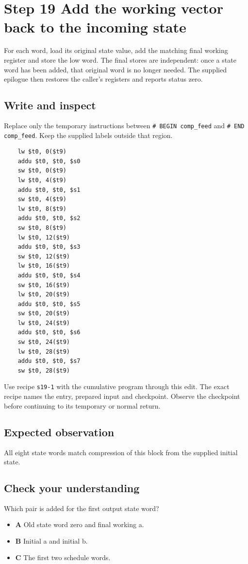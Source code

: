 \section{Step 19 Add the working vector back to the incoming state}\label{sha-s19}

For each word, load its original state value, add the matching final working register and store the low word. The final stores are independent: once a state word has been added, that original word is no longer needed. The supplied epilogue then restores the caller's registers and reports status zero.

\subsection{Write and inspect}
Replace only the temporary instructions between \texttt{\# BEGIN comp\_feed} and \texttt{\# END comp\_feed}. Keep the supplied labels outside that region.

\begin{verbatim}
    lw $t0, 0($t9)
    addu $t0, $t0, $s0
    sw $t0, 0($t9)
    lw $t0, 4($t9)
    addu $t0, $t0, $s1
    sw $t0, 4($t9)
    lw $t0, 8($t9)
    addu $t0, $t0, $s2
    sw $t0, 8($t9)
    lw $t0, 12($t9)
    addu $t0, $t0, $s3
    sw $t0, 12($t9)
    lw $t0, 16($t9)
    addu $t0, $t0, $s4
    sw $t0, 16($t9)
    lw $t0, 20($t9)
    addu $t0, $t0, $s5
    sw $t0, 20($t9)
    lw $t0, 24($t9)
    addu $t0, $t0, $s6
    sw $t0, 24($t9)
    lw $t0, 28($t9)
    addu $t0, $t0, $s7
    sw $t0, 28($t9)
\end{verbatim}

Use recipe \texttt{s19-1} with the cumulative program through this edit. The exact recipe names the entry, prepared input and checkpoint. Observe the checkpoint before continuing to its temporary or normal return.

\subsection{Expected observation}
All eight state words match compression of this block from the supplied initial state.

\subsection{Check your understanding}
Which pair is added for the first output state word?

\begin{itemize}
\item \textbf{A} Old state word zero and final working a.
\item \textbf{B} Initial a and initial b.
\item \textbf{C} The first two schedule words.
\end{itemize}
